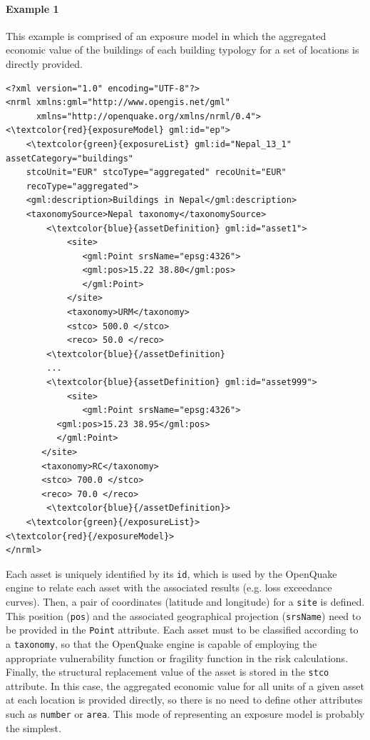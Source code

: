 \paragraph{Example 1}
This example is comprised of an \gls{exposure model} in which the aggregated economic value of the buildings of each building typology for a set of locations is directly provided.

\begin{Verbatim}[frame=single, commandchars=\\\{\}, samepage=false]
<?xml version="1.0" encoding="UTF-8"?>
<nrml xmlns:gml="http://www.opengis.net/gml"
      xmlns="http://openquake.org/xmlns/nrml/0.4">
<\textcolor{red}{exposureModel} gml:id="ep">
    <\textcolor{green}{exposureList} gml:id="Nepal_13_1" assetCategory="buildings" 
    stcoUnit="EUR" stcoType="aggregated" recoUnit="EUR" 
    recoType="aggregated">
    <gml:description>Buildings in Nepal</gml:description>
    <taxonomySource>Nepal taxonomy</taxonomySource>
        <\textcolor{blue}{assetDefinition} gml:id="asset1">
            <site>
               <gml:Point srsName="epsg:4326">
               <gml:pos>15.22 38.80</gml:pos>
               </gml:Point>
            </site>
            <taxonomy>URM</taxonomy>
            <stco> 500.0 </stco>
            <reco> 50.0 </reco>
        <\textcolor{blue}{/assetDefinition} 
        ...
        <\textcolor{blue}{assetDefinition} gml:id="asset999">
            <site>
               <gml:Point srsName="epsg:4326">
	      <gml:pos>15.23 38.95</gml:pos>
	      </gml:Point>
	   </site>
	   <taxonomy>RC</taxonomy>
	   <stco> 700.0 </stco>
	   <reco> 70.0 </reco>
        <\textcolor{blue}{/assetDefinition}> 
    <\textcolor{green}{/exposureList}>
<\textcolor{red}{/exposureModel}>
</nrml>
\end{Verbatim}

Each \gls{asset} is uniquely identified by its \Verb+id+, which is used by the OpenQuake engine to relate each asset with the associated results (e.g. loss exceedance curves). Then, a pair of coordinates (latitude and longitude) for a \Verb+site+ is defined. This position (\Verb+pos+) and the associated geographical projection (\Verb+srsName+) need to be provided in the \Verb+Point+ attribute. Each asset must to be classified according to a \Verb+taxonomy+, so that the OpenQuake engine is capable of employing the appropriate \gls{vulnerability function} or \gls{fragility function} in the risk calculations. Finally, the structural replacement value of the asset is stored in the \Verb+stco+ attribute. In this case, the aggregated economic value for all units of a given asset at each location is provided directly, so there is no need to define other attributes such as \Verb+number+ or \Verb+area+. This mode of representing an exposure model is probably the simplest.\\ 

